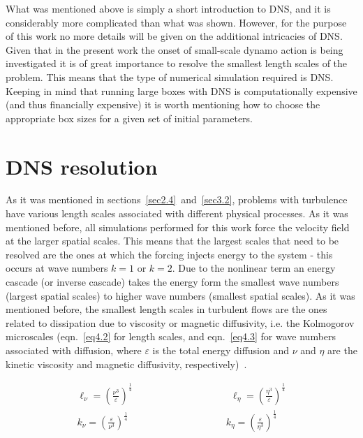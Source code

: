 \documentclass[12pt,a4paper]{report}
\begin{document}
What was mentioned above is simply a short introduction to DNS, and it is considerably more complicated than what was shown. However, for the purpose of this work no more details will be given on the additional intricacies of DNS. Given that in the present work the onset of small-scale dynamo action is being investigated it is of great importance to resolve the smallest length scales of the problem. This means that the type of numerical simulation required is DNS. Keeping in mind that running large boxes with DNS is computationally expensive (and thus financially expensive) it is worth mentioning how to choose the appropriate box sizes for a given set of initial parameters.

\section{DNS resolution}
\label{sec4.2}

As it was mentioned in sections~\ref{sec2.4}~and~\ref{sec3.2}, problems with turbulence have various length scales associated with different physical processes. As it was mentioned before, all simulations performed for this work force the velocity field at the larger spatial scales. This means that the largest scales that need to be resolved are the ones at which the forcing injects energy to the system - this occurs at wave numbers $k=1$ or $k=2$. Due to the nonlinear term an energy cascade (or inverse cascade) takes the energy form the smallest wave numbers (largest spatial scales) to higher wave numbers (smallest spatial scales). As it was mentioned before, the smallest length scales in turbulent flows are the ones related to dissipation due to viscosity or magnetic diffusivity, i.e. the Kolmogorov microscales (eqn.~\ref{eq4.2} for length scales, and eqn.~\ref{eq4.3} for wave numbers associated with diffusion, where $\varepsilon$ is the total energy diffusion and $\nu$ and $\eta$ are the kinetic viscosity and magnetic diffusivity, respectively)~\cite{yoffe2013investigation, LinkmannMoritzFrederikLeon2016Spim}.

\begin{align}
 \ell_\nu = \left( \frac{\nu^3}{\varepsilon} \right)^{\frac{1}{4}} \qquad \qquad \qquad \qquad \qquad \ell_\eta = \left( \frac{\eta^3}{\varepsilon} \right)^{\frac{1}{4}}
 \label{eq4.2}\\
 k_\nu = \left( \frac{\varepsilon}{\nu^3} \right)^{\frac{1}{4}} \qquad \qquad \qquad \qquad \qquad k_\eta = \left( \frac{\varepsilon}{\eta^3} \right)^{\frac{1}{4}} \label{eq4.3}
\end{align}
\end{document}
